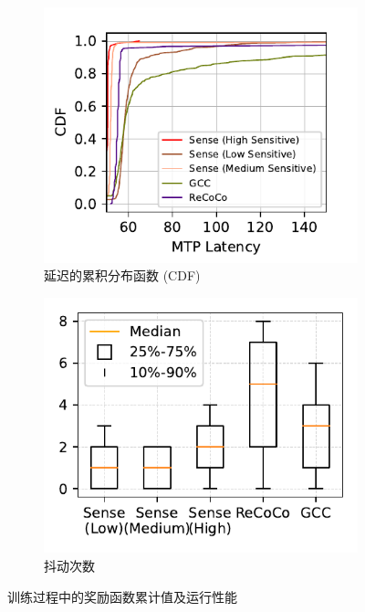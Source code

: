 \begin{figure}[!ht]
\begin{subfigure}[t]{0.5\linewidth}
  \centering
  \includegraphics[width=\linewidth]{figures/chap03/evaluation_plots/cdf_delay.pdf}
  \caption{延迟的累积分布函数 (CDF)}
  \label{fig-latency-cdf}
\end{subfigure}%
\begin{subfigure}[t]{0.5\linewidth}
  \centering
  \includegraphics[width=\linewidth]{figures/chap03/evaluation_plots/jitter_times.pdf}
  \caption{抖动次数}
  \label{fig-jitter-times}
\end{subfigure}

\caption{训练过程中的奖励函数累计值及运行性能}
\label{fig-evaluation-result}
\end{figure}

